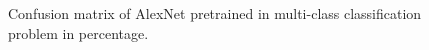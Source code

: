 \begin{figure}[t]
	\begin{center}
	\end{center}
	\caption{Confusion matrix of AlexNet pretrained in multi-class classification problem in percentage. }
	\label{fig:sensitivity}
	\label{fig:long}
	\label{fig:onecol}
\end{figure}
